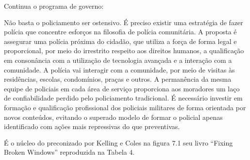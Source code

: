 \documentclass[
	12pt,				%
	openright,			%
	twoside,			%
	a4paper,			%
	chapter=TITLE,		%
	section=TITLE,		%
	subsection=TITLE,	%
	subsubsection=TITLE,%
	spanish,            %
	english,			%
	brazil				%
	]{abntex2}
\begin{document}
\hypertarget{PC}{}
\par
Continua o programa de governo:
\begin{citacao}
	Não basta o policiamento ser ostensivo. É preciso existir uma estratégia de fazer polícia que
	concentre esforços na filosofia de polícia comunitária.
	A proposta é assegurar uma polícia próxima do cidadão, que utiliza a força de forma legal e
	proporcional, por meio do irrestrito respeito aos direitos humanos, a qualificação em
	consonância com a utilização de tecnologia avançada e a interação com a comunidade.
	A polícia vai interagir com a comunidade, por meio de visitas às residências, escolas,
	condomínios, praças e outros. A permanência da mesma equipe de policiais em cada área de
	serviço proporciona aos moradores um laço de confiabilidade perdido pelo policiamento
	tradicional.
	É necessário investir em formação e qualificação profissional dos policiais militares de forma
	orientada por novos conteúdos, evitando o superado modelo de formar o policial apenas
	identificado com ações mais repressivas do que preventivas.\cite[p. ~27]{CLP}
\end{citacao}
\par
É o núcleo do preconizado por Kelling e Coles na figura 7.1 seu livro “Fixing Broken Windows” reproduzida na Tabela 4.
\end{document}
